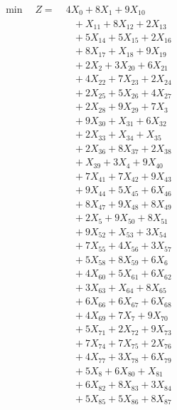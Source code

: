 \documentclass[a4paper,10pt]{article}
\begin{document}
\allowdisplaybreaks
{\small
\begin{align}
\min \quad Z = &\; 4X_{0} + 8X_{1} + 9X_{10} \\[0.5ex]
&\quad  + X_{11} + 8X_{12} + 2X_{13} \\[0.5ex]
&\quad  + 5X_{14} + 5X_{15} + 2X_{16} \\[0.5ex]
&\quad  + 8X_{17} + X_{18} + 9X_{19} \\[0.5ex]
&\quad  + 2X_{2} + 3X_{20} + 6X_{21} \\[0.5ex]
&\quad  + 4X_{22} + 7X_{23} + 2X_{24} \\[0.5ex]
&\quad  + 2X_{25} + 5X_{26} + 4X_{27} \\[0.5ex]
&\quad  + 2X_{28} + 9X_{29} + 7X_{3} \\[0.5ex]
&\quad  + 9X_{30} + X_{31} + 6X_{32} \\[0.5ex]
&\quad  + 2X_{33} + X_{34} + X_{35} \\[0.5ex]
&\quad  + 2X_{36} + 8X_{37} + 2X_{38} \\[0.5ex]
&\quad  + X_{39} + 3X_{4} + 9X_{40} \\[0.5ex]
&\quad  + 7X_{41} + 7X_{42} + 9X_{43} \\[0.5ex]
&\quad  + 9X_{44} + 5X_{45} + 6X_{46} \\[0.5ex]
&\quad  + 8X_{47} + 9X_{48} + 8X_{49} \\[0.5ex]
&\quad  + 2X_{5} + 9X_{50} + 8X_{51} \\[0.5ex]
&\quad  + 9X_{52} + X_{53} + 3X_{54} \\[0.5ex]
&\quad  + 7X_{55} + 4X_{56} + 3X_{57} \\[0.5ex]
&\quad  + 5X_{58} + 8X_{59} + 6X_{6} \\[0.5ex]
&\quad  + 4X_{60} + 5X_{61} + 6X_{62} \\[0.5ex]
&\quad  + 3X_{63} + X_{64} + 8X_{65} \\[0.5ex]
&\quad  + 6X_{66} + 6X_{67} + 6X_{68} \\[0.5ex]
&\quad  + 4X_{69} + 7X_{7} + 9X_{70} \\[0.5ex]
&\quad  + 5X_{71} + 2X_{72} + 9X_{73} \\[0.5ex]
&\quad  + 7X_{74} + 7X_{75} + 2X_{76} \\[0.5ex]
&\quad  + 4X_{77} + 3X_{78} + 6X_{79} \\[0.5ex]
&\quad  + 5X_{8} + 6X_{80} + X_{81} \\[0.5ex]
&\quad  + 6X_{82} + 8X_{83} + 3X_{84} \\[0.5ex]
&\quad  + 5X_{85} + 5X_{86} + 8X_{87} \\[0.5ex]

\end{align}}
\end{document}
